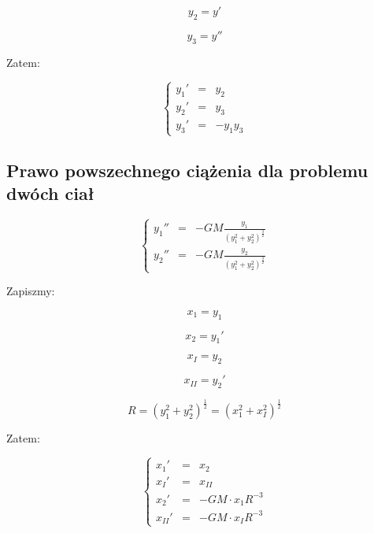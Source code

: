 \documentclass{article}
\begin{document}
	\begin{equation}
		y_2 = y'
	\end{equation}

	\begin{equation}
		y_3 = y''
	\end{equation}


	\newpage

	Zatem:

	\begin{equation}
		\left\{\begin{array}{rcl}
			y_1'&=&y_2\\
			y_2'&=&y_3\\
			y_3'&=&-y_1y_3
			\end{array} \right.
	\end{equation}


	\subsection*{Prawo powszechnego ciążenia dla problemu dwóch ciał}

	\begin{equation}
		\left\{\begin{array}{rcl}
			y_1''&=&-GM \frac{y_1}{(y_1^2+y_2^2)^{\frac{3}{2}}}\\
			y_2''&=&-GM \frac{y_2}{(y_1^2+y_2^2)^{\frac{3}{2}}}
			\end{array} \right.
	\end{equation}

	Zapiszmy:

	\begin{equation}
		x_1 = y_1
	\end{equation}

	\begin{equation}
		x_2 = y_1'
	\end{equation}

	\begin{equation}
		x_{I} = y_2
	\end{equation}

	\begin{equation}
		x_{II} = y_2'
	\end{equation}

	\begin{equation}
		R = (y_1^2+y_2^2)^{\frac{1}{2}} = (x_1^2+x_I^2)^{\frac{1}{2}}
	\end{equation}

	Zatem:

	\begin{equation}
		\left\{\begin{array}{rcl}
			x_1'&=&x_2\\
			x_I'&=&x_{II}\\
			x_2'&=&-GM \cdot x_1 R^{-3}\\
			x_{II}'&=&-GM  \cdot x_I R^{-3}
			\end{array} \right.
	\end{equation}
\end{document}
